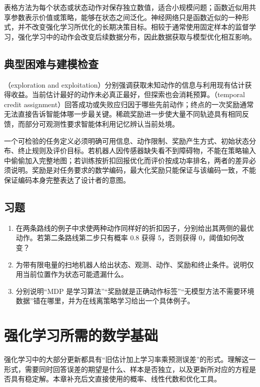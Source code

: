 \documentclass[UTF8,12pt,a4paper,fontset=fandol]{ctexbook}
\begin{document}
表格方法为每个状态或状态动作对保存独立数值，适合小规模问题；函数近似用共享参数表示价值或策略，能够在状态之间泛化。神经网络只是函数近似的一种形式，并不改变强化学习所优化的长期决策目标。相较于通常使用固定样本的监督学习，强化学习中的动作会改变后续数据分布，因此数据获取与模型优化相互影响。

\section{典型困难与建模检查}

（exploration and exploitation）分别强调获取未知动作的信息与利用现有估计获得收益。当前估计最好的动作未必真正最好，但探索也会消耗预算。（temporal credit assignment）回答成功或失败应归因于哪些先前动作；终点的一次奖励通常无法直接告诉智能体哪一步最关键。稀疏奖励进一步使大量不同轨迹具有相同反馈，而部分可观测性要求智能体利用记忆辨认当前处境。

一个可检验的任务定义必须明确可用信息、动作限制、奖励产生方式、初始状态分布、终止规则及评价目标。若机器人因传感器缺失看不到障碍物，不能在策略输入中偷偷加入完整地图；若训练按折扣回报优化而评价按成功率排名，两者的差异必须说明。奖励是对任务要求的数学编码，最大化奖励只能保证与该编码一致，不能保证编码本身完整表达了设计者的意图。

\section{习题}
\begin{enumerate}
\item 在两条路线的例子中求使两种动作同样好的折扣因子，分别给出其两侧的最优动作。若第二条路线第二步只有概率 $0.8$ 获得 $5$，否则获得 $0$，阈值如何改变？
\item 为带有限电量的扫地机器人给出状态、观测、动作、奖励和终止条件。说明仅用当前位置作为状态可能遗漏什么。
\item 分别说明“MDP 是学习算法”“奖励就是正确动作标签”“无模型方法不需要环境数据”错在哪里，并为在线离策略学习给出一个具体例子。
\end{enumerate}

\chapter{强化学习所需的数学基础}
\label{ch:rl-math}

强化学习中的大部分更新都具有“旧估计加上学习率乘预测误差”的形式。理解这一形式，需要同时回答误差的期望是什么、样本是否独立，以及更新所对应的方程是否具有稳定解。本章补充后文直接使用的概率、线性代数和优化工具。
\end{document}

